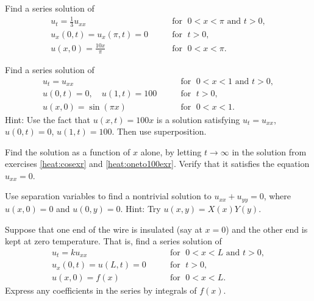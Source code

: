 \begin{exercise} \label{heat:cosexr}
Find a series solution of
\begin{equation*}
\begin{array}{ll}
u_t = \frac{1}{3} u_{xx} & \qquad \text{for } \; 0 < x < \pi \text{ and } t > 0, \\
u_x(0,t) = u_x(\pi,t) = 0 & \qquad \text{for } \; t > 0, \\
u(x,0) = \frac{10x}{\pi} & \qquad \text{for } \; 0 < x < \pi .
\end{array}
\end{equation*}
\end{exercise}

\begin{exercise} \label{heat:oneto100exr}
Find a series solution of
\begin{equation*}
\begin{array}{ll}
u_t =  u_{xx} & \qquad \text{for } \; 0 < x < 1 \text{ and } t > 0, \\
u(0,t) = 0 , \quad u(1,t) = 100 & \qquad \text{for } \; t > 0, \\
u(x,0) = \sin (\pi x) & \qquad \text{for } \; 0 < x < 1 .
\end{array}
\end{equation*}
Hint: Use the fact that $u(x,t) = 100 x$ is a solution satisfying
$u_t = u_{xx}$, $u(0,t) = 0$, $u(1,t) = 100$.  Then use superposition.
\end{exercise}

\begin{exercise}
Find the \emph{} solution as a function
of $x$ alone,
by letting $t \to
\infty$ in the solution from
exercises \ref{heat:cosexr} and \ref{heat:oneto100exr}.
Verify that it satisfies the equation $u_{xx} = 0$.
\end{exercise}

\begin{exercise}
Use separation variables to find a nontrivial
solution to $u_{xx} + u_{yy} = 0$, where $u(x,0) = 0$ and $u(0,y) = 0$.
Hint: Try $u(x,y) = X(x)Y(y)$.
\end{exercise}

\begin{exercise}[challenging]
Suppose that one end of the wire is insulated (say at $x=0$) and
the other end is kept at zero temperature.  That is,
find a series solution of
\begin{equation*}
\begin{array}{ll}
u_t = k u_{xx} & \qquad \text{for } \; 0 < x < L \text{ and } t > 0, \\
u_x(0,t) = u(L,t) = 0  & \qquad \text{for } \; t > 0, \\
u(x,0) = f(x) & \qquad \text{for } \; 0 < x < L .
\end{array}
\end{equation*}
Express any coefficients in the series by integrals of $f(x)$.
\end{exercise}

